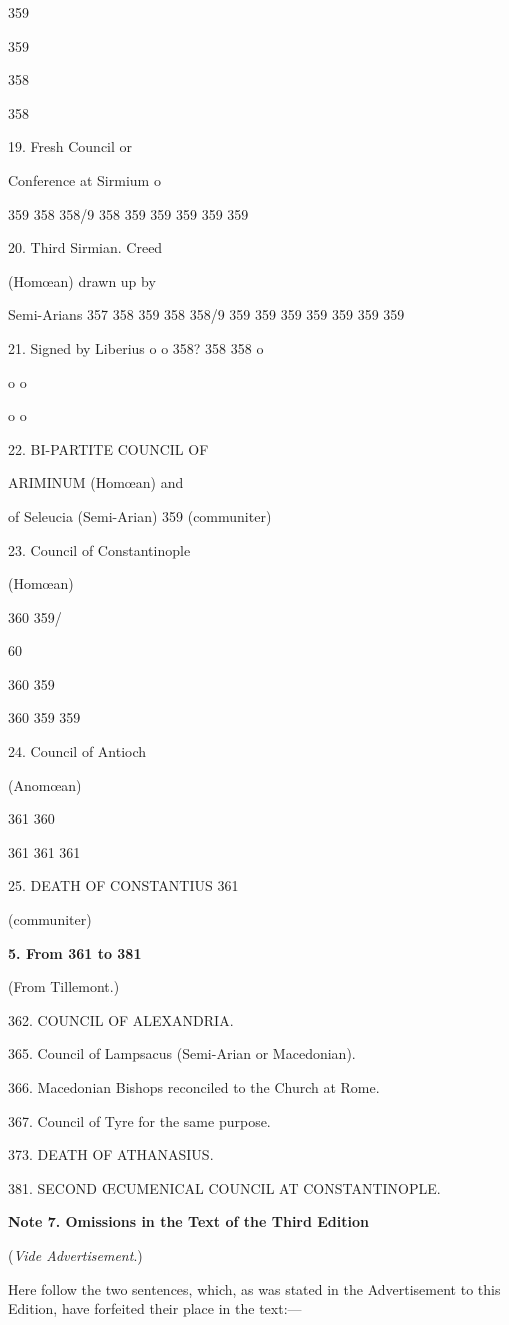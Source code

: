 359

359

358

358

19. Fresh Council or

Conference at Sirmium
o

359
358
358/9
358
359
359
359
359
359

20. Third Sirmian. Creed

(Homœan) drawn up by

Semi-Arians
357
358
359
358
358/9
359
359
359
359
359
359
359

21. Signed by Liberius
o
o
358?
358
358
o

o
o

o
o

22. BI-PARTITE
COUNCIL OF

ARIMINUM (Homœan) and

of Seleucia (Semi-Arian)
359
(communiter)

23. Council of Constantinople

(Homœan)

360
359/

60

360
359

360
359
359

24. Council of Antioch

(Anomœan)

361
360

361
361
361

25. DEATH OF
CONSTANTIUS
361

(communiter)

\textbf{5. From 361 to 381}

(From Tillemont.)

362.
COUNCIL OF
ALEXANDRIA.

365.
Council of Lampsacus (Semi-Arian or Macedonian).

366.
Macedonian Bishops reconciled to the Church at
Rome.

367.
Council of Tyre for the same purpose.

373.
DEATH OF
ATHANASIUS.

381.
SECOND ŒCUMENICAL
COUNCIL AT CONSTANTINOPLE.

\textbf{Note 7. Omissions in the Text of the
Third Edition}

(\emph{Vide Advertisement}.)

Here follow the two sentences, which, as was stated in the
Advertisement to this Edition, have forfeited their place in the text:—

